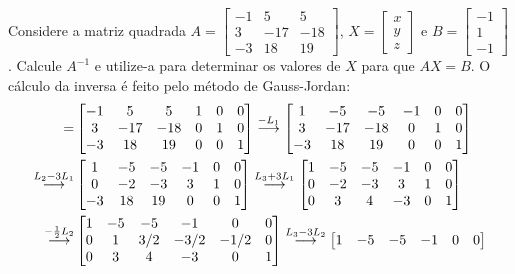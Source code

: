 \documentclass[12pt,a4paper]{article}
\newcommand{\grstep}[2][\relax]{%
   \ensuremath{\mathrel{
       {\mathop{\longrightarrow}\limits^{#2\mathstrut}_{
                                     \begin{subarray}{l} #1 \end{subarray}}}}}}
\begin{document}
\begin{ExerciseList}
\Exercise[title={1,8}] Considere a matriz quadrada $A = \begin{bmatrix}
-1 & 5 & 5\\
3 & -17 & -18\\
-3 & 18 & 19
\end{bmatrix}$, $X=\begin{bmatrix}x\\y\\z\end{bmatrix}$ e $B=\begin{bmatrix}-1\\1\\-1\end{bmatrix}$.
Calcule $A^{-1}$ e utilize-a para determinar os valores de $X$ para que $AX = B$.
\Answer O cálculo da inversa é feito pelo método de Gauss-Jordan:
\begin{align*}
[ A | I] =
& \begin{bmatrix}
-1 &   5 &   5 & 1 & 0 & 0 \\
 3 & -17 & -18 & 0 & 1 & 0 \\
-3 &  18 &  19 & 0 & 0 & 1
\end{bmatrix}
\grstep{ -L_1 }
\begin{bmatrix}
 1 &  -5 &  -5 & -1 & 0 & 0 \\
 3 & -17 & -18 &  0 & 1 & 0 \\
-3 &  18 &  19 &  0 & 0 & 1
\end{bmatrix} \\
\grstep{ L_2 - 3L_1 }
& \begin{bmatrix}
 1 &  -5 & -5 & -1 & 0 & 0 \\
 0 &  -2 & -3 &  3 & 1 & 0 \\
-3 &  18 & 19 &  0 & 0 & 1
\end{bmatrix}
\grstep{ L_3 + 3L_1 }
\begin{bmatrix}
1 & -5 & -5 & -1 & 0 & 0 \\
0 & -2 & -3 &  3 & 1 & 0 \\
0 &  3 &  4 & -3 & 0 & 1
\end{bmatrix}\\
\grstep{ -\frac{1}{2} L_2 }
& \begin{bmatrix}
1 & -5 & -5 & -1 & 0 & 0 \\
0 &  1 & 3/2 & -3/2 & -1/2 & 0 \\
0 &  3 &  4 & -3 & 0 & 1
\end{bmatrix}
\grstep{ L_3 - 3L_2 }
\begin{bmatrix}
1 & -5 & -5 & -1 & 0 & 0 \\

\end{bmatrix}
\end{align*}
\end{ExerciseList}
\end{document}
